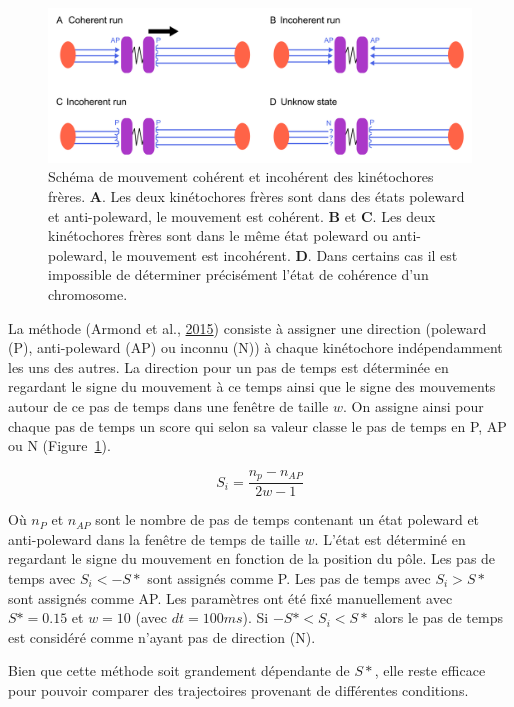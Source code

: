 \documentclass[12pt,a4paper,twoside,openright]{book}
\begin{document}
\begin{figure}[htbp]
\centering
\includegraphics{figures/results/imaging/coherence_schema.png}
\caption[Schéma de mouvement cohérent et incohérent des kinétochores frères.]{\label{fig:coherence_schema}Schéma
de mouvement cohérent et incohérent des kinétochores frères. \textbf{A}.
Les deux kinétochores frères sont dans des états poleward et
anti-poleward, le mouvement est cohérent. \textbf{B} et \textbf{C}. Les
deux kinétochores frères sont dans le même état poleward ou
anti-poleward, le mouvement est incohérent. \textbf{D}. Dans certains
cas il est impossible de déterminer précisément l'état de cohérence d'un
chromosome.}
\end{figure}

La méthode (Armond et al., \hyperref[ref-Armond2015]{2015}) consiste à
assigner une direction (poleward (P), anti-poleward (AP) ou inconnu (N))
à chaque kinétochore indépendamment les uns des autres. La direction
pour un pas de temps est déterminée en regardant le signe du mouvement à
ce temps ainsi que le signe des mouvements autour de ce pas de temps
dans une fenêtre de taille \(w\). On assigne ainsi pour chaque pas de
temps un score qui selon sa valeur classe le pas de temps en P, AP ou N
(Figure~\ref{fig:coherence_schema}).

\[
S_i = \frac{n_p - n_{AP}}{2w - 1}
\]

Où \(n_P\) et \(n_{AP}\) sont le nombre de pas de temps contenant un
état poleward et anti-poleward dans la fenêtre de temps de taille \(w\).
L'état est déterminé en regardant le signe du mouvement en fonction de
la position du pôle. Les pas de temps avec \(S_i < -S*\) sont assignés
comme P. Les pas de temps avec \(S_i > S*\) sont assignés comme AP. Les
paramètres ont été fixé manuellement avec \(S* = 0.15\) et \(w = 10\)
(avec \(dt=100ms\)). Si \(-S* < S_i < S*\) alors le pas de temps est
considéré comme n'ayant pas de direction (N).

Bien que cette méthode soit grandement dépendante de \(S*\), elle reste
efficace pour pouvoir comparer des trajectoires provenant de différentes
conditions.
\end{document}
